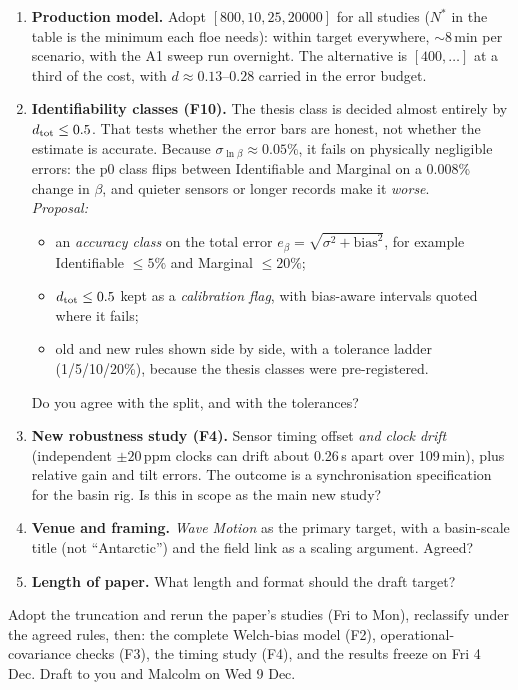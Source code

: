 \documentclass[10pt,a4paper]{article}
\newcommand{\head}[1]{\par\vspace{4pt}{\bfseries\color{ocean}#1}\par\vspace{1pt}}
\begin{document}
\head{2. Questions}
\begin{enumerate}
\item \textbf{Production model.} Adopt $[800,10,25,20000]$ for all studies ($N^*$ in the table is the minimum each floe needs): within target everywhere, $\sim$8\,min per scenario, with the A1 sweep run overnight. The alternative is $[400,\ldots]$ at a third of the cost, with $d\approx0.13$--$0.28$ carried in the error budget.
\item \textbf{Identifiability classes (F10).} The thesis class is decided almost entirely by $d_{\rm tot}\le0.5$. That tests whether the error bars are honest, not whether the estimate is accurate. Because $\sigma_{\ln\beta}\approx0.05\%$, it fails on physically negligible errors: the p0 class flips between Identifiable and Marginal on a 0.008\% change in $\beta$, and quieter sensors or longer records make it \emph{worse}.\\
\emph{Proposal:}
\begin{itemize}
\item an \emph{accuracy class} on the total error $e_\beta=\sqrt{\sigma^2+\text{bias}^2}$, for example Identifiable $\le5\%$ and Marginal $\le20\%$;
\item $d_{\rm tot}\le0.5$ kept as a \emph{calibration flag}, with bias-aware intervals quoted where it fails;
\item old and new rules shown side by side, with a tolerance ladder (1/5/10/20\%), because the thesis classes were pre-registered.
\end{itemize}
Do you agree with the split, and with the tolerances?
\item \textbf{New robustness study (F4).} Sensor timing offset \emph{and clock drift} (independent $\pm20$\,ppm clocks can drift about 0.26\,s apart over 109\,min), plus relative gain and tilt errors. The outcome is a synchronisation specification for the basin rig. Is this in scope as the main new study?
\item \textbf{Venue and framing.} \emph{Wave Motion} as the primary target, with a basin-scale title (not ``Antarctic'') and the field link as a scaling argument. Agreed?
\item \textbf{Length of paper.} What length and format should the draft target?
\end{enumerate}

\head{3. Next steps if agreed}
Adopt the truncation and rerun the paper's studies (Fri to Mon), reclassify under the agreed rules, then: the complete Welch-bias model (F2), operational-covariance checks (F3), the timing study (F4), and the results freeze on Fri 4 Dec. Draft to you and Malcolm on Wed 9 Dec.
\end{document}
